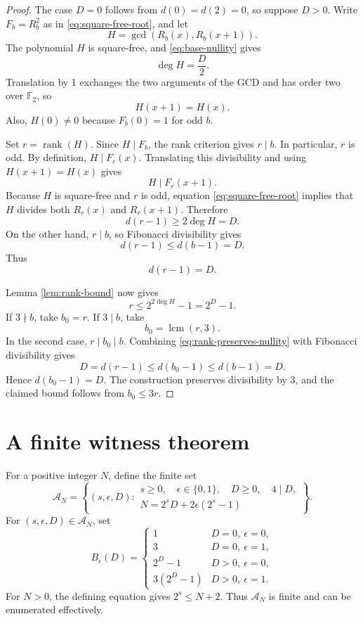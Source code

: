 \documentclass[a4paper]{article}
\newcommand{\F}{\mathbb{F}}
\DeclareMathOperator{\rank}{rank}
\begin{document}
\begin{proof}
	The case $D=0$ follows from $d(0)=d(2)=0$, so suppose $D>0$.
	Write $F_b=R_b^2$ as in \eqref{eq:square-free-root}, and let
	\[
		H=\gcd(R_b(x),R_b(x+1)).
	\]
	The polynomial $H$ is square-free, and \eqref{eq:base-nullity} gives
	\[
		\deg H=\frac{D}{2}.
	\]
	Translation by 1 exchanges the two arguments of the GCD and has
	order two over $\F_2$, so
	\[
		H(x+1)=H(x).
	\]
	Also, $H(0)\neq0$ because $F_b(0)=1$ for odd $b$.

	Set $r=\rank(H)$.
	Since $H\mid F_b$, the rank criterion gives $r\mid b$.
	In particular, $r$ is odd.
	By definition, $H\mid F_r(x)$.
	Translating this divisibility and using $H(x+1)=H(x)$ gives
	\[
		H\mid F_r(x+1).
	\]
	Because $H$ is square-free and $r$ is odd, equation
	\eqref{eq:square-free-root} implies that $H$ divides both
	$R_r(x)$ and $R_r(x+1)$.
	Therefore
	\[
		d(r-1)\geq2\deg H=D.
	\]
	On the other hand, $r\mid b$, so Fibonacci divisibility gives
	\[
		d(r-1)\leq d(b-1)=D.
	\]
	Thus
	\begin{equation}\label{eq:rank-preserves-nullity}
		d(r-1)=D.
	\end{equation}

	Lemma \ref{lem:rank-bound} now gives
	\[
		r\leq2^{2\deg H}-1=2^D-1.
	\]
	If $3\nmid b$, take $b_0=r$.
	If $3\mid b$, take
	\[
		b_0=\operatorname{lcm}(r,3).
	\]
	In the second case, $r\mid b_0\mid b$.
	Combining \eqref{eq:rank-preserves-nullity} with Fibonacci
	divisibility gives
	\[
		D=d(r-1)\leq d(b_0-1)\leq d(b-1)=D.
	\]
	Hence $d(b_0-1)=D$.
	The construction preserves divisibility by 3, and the claimed bound
	follows from $b_0\leq3r$.
\end{proof}

\section{A finite witness theorem}

For a positive integer $N$, define the finite set
\[
	\mathcal{A}_N
	=
	\left\{
		(s,\epsilon,D):
		\begin{array}{l}
			s\geq0,\quad \epsilon\in\{0,1\},\quad
			D\geq0,\quad4\mid D,\\[2pt]
			N=2^sD+2\epsilon(2^s-1)
		\end{array}
	\right\}.
\]
For $(s,\epsilon,D)\in\mathcal{A}_N$, set
\[
	B_\epsilon(D)
	=
	\begin{cases}
		1 & D=0,\ \epsilon=0,\\
		3 & D=0,\ \epsilon=1,\\
		2^D-1 & D>0,\ \epsilon=0,\\
		3(2^D-1) & D>0,\ \epsilon=1.
	\end{cases}
\]
For $N>0$, the defining equation gives $2^s\leq N+2$.
Thus $\mathcal{A}_N$ is finite and can be enumerated effectively.
\end{document}
